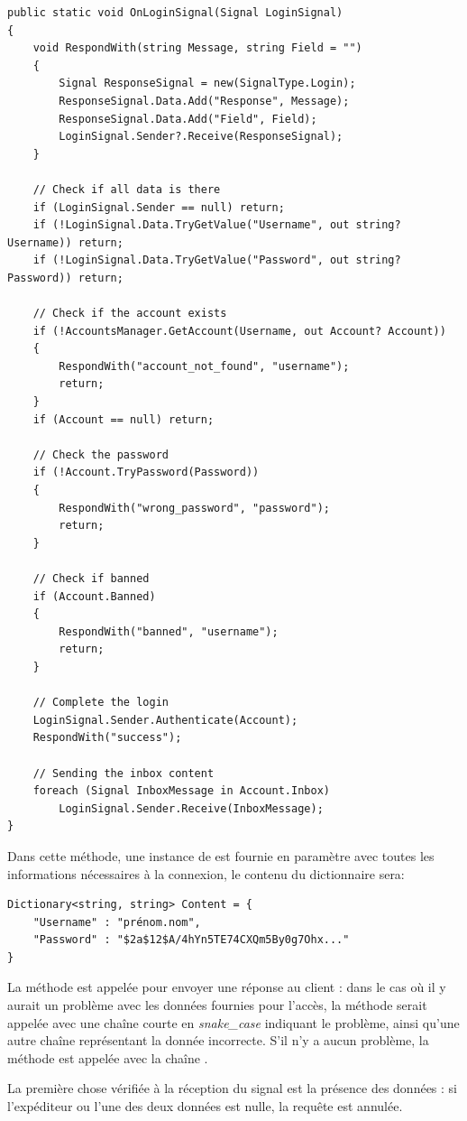 \documentclass[12pt]{report}
\begin{document}
	\begin{verbatim}
public static void OnLoginSignal(Signal LoginSignal)
{
	void RespondWith(string Message, string Field = "")
	{
		Signal ResponseSignal = new(SignalType.Login);
		ResponseSignal.Data.Add("Response", Message);
		ResponseSignal.Data.Add("Field", Field);
		LoginSignal.Sender?.Receive(ResponseSignal);
	}
	
	// Check if all data is there 
	if (LoginSignal.Sender == null) return;
	if (!LoginSignal.Data.TryGetValue("Username", out string? Username)) return;
	if (!LoginSignal.Data.TryGetValue("Password", out string? Password)) return;
	
	// Check if the account exists 
	if (!AccountsManager.GetAccount(Username, out Account? Account))
	{
		RespondWith("account_not_found", "username");
		return;
	}
	if (Account == null) return;
	
	// Check the password 
	if (!Account.TryPassword(Password))
	{
		RespondWith("wrong_password", "password");
		return;
	}
	
	// Check if banned 
	if (Account.Banned)
	{
		RespondWith("banned", "username");
		return;
	}
	
	// Complete the login
	LoginSignal.Sender.Authenticate(Account);
	RespondWith("success");
	
	// Sending the inbox content
	foreach (Signal InboxMessage in Account.Inbox) 
		LoginSignal.Sender.Receive(InboxMessage);
}
	\end{verbatim}
	
	Dans cette méthode, une instance de  est fournie en paramètre avec toutes les informations nécessaires à la connexion, le contenu du dictionnaire  sera:
	\begin{verbatim}
Dictionary<string, string> Content = {
	"Username" : "prénom.nom",
	"Password" : "$2a$12$A/4hYn5TE74CXQm5By0g7Ohx..."
}
	\end{verbatim}
	
	La méthode  est appelée pour envoyer une réponse au client : dans le cas où il y aurait un problème avec les données fournies pour l’accès, la méthode serait appelée avec une chaîne courte en \textit{snake\_case} indiquant le problème, ainsi qu’une autre chaîne représentant la donnée incorrecte. S’il n’y a aucun problème, la méthode est appelée avec la chaîne .
	
	La première chose vérifiée à la réception du signal est la présence des données : si l’expéditeur ou l’une des deux données est nulle, la requête est annulée.
	
\end{document}
